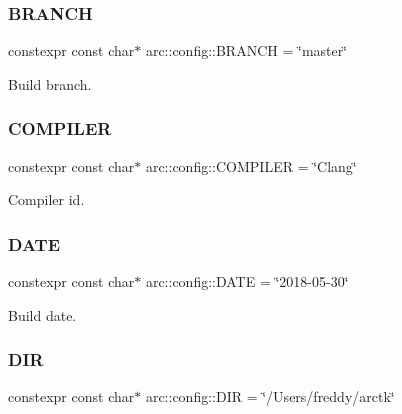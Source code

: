 \subsubsection{\texorpdfstring{B\+R\+A\+N\+CH}{BRANCH}}
{\footnotesize\ttfamily constexpr const char$\ast$ arc\+::config\+::\+B\+R\+A\+N\+CH = \char`\"{}master\char`\"{}}



Build branch. 

\mbox{\label{namespacearc_1_1config_abfeebd457f762473ba01e07e14c8d084}} 
\subsubsection{\texorpdfstring{C\+O\+M\+P\+I\+L\+ER}{COMPILER}}
{\footnotesize\ttfamily constexpr const char$\ast$ arc\+::config\+::\+C\+O\+M\+P\+I\+L\+ER = \char`\"{}Clang\char`\"{}}



Compiler id. 

\mbox{\label{namespacearc_1_1config_aa60520859e13bbee2fb47d352d337c87}} 
\subsubsection{\texorpdfstring{D\+A\+TE}{DATE}}
{\footnotesize\ttfamily constexpr const char$\ast$ arc\+::config\+::\+D\+A\+TE = \char`\"{}2018-\/05-\/30\char`\"{}}



Build date. 

\mbox{\label{namespacearc_1_1config_a07a575e6c44170c6f629402c89f0a044}} 
\subsubsection{\texorpdfstring{D\+IR}{DIR}}
{\footnotesize\ttfamily constexpr const char$\ast$ arc\+::config\+::\+D\+IR = \char`\"{}/Users/freddy/arctk\char`\"{}}



